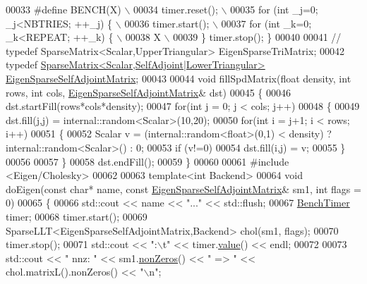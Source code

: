 \begin{DoxyCode}
00033 \textcolor{preprocessor}{#define BENCH(X) \(\backslash\)}
00034 \textcolor{preprocessor}{  timer.reset(); \(\backslash\)}
00035 \textcolor{preprocessor}{  for (int \_j=0; \_j<NBTRIES; ++\_j) \{ \(\backslash\)}
00036 \textcolor{preprocessor}{    timer.start(); \(\backslash\)}
00037 \textcolor{preprocessor}{    for (int \_k=0; \_k<REPEAT; ++\_k) \{ \(\backslash\)}
00038 \textcolor{preprocessor}{        X  \(\backslash\)}
00039 \textcolor{preprocessor}{  \} timer.stop(); \}}
00040 
00041 \textcolor{comment}{// typedef SparseMatrix<Scalar,UpperTriangular> EigenSparseTriMatrix;}
00042 \textcolor{keyword}{typedef} \hyperlink{group___sparse_core___module_class_eigen_1_1_sparse_matrix}{SparseMatrix<Scalar,SelfAdjoint|LowerTriangular>} 
      \hyperlink{group___sparse_core___module_class_eigen_1_1_sparse_matrix}{EigenSparseSelfAdjointMatrix};
00043 
00044 \textcolor{keywordtype}{void} fillSpdMatrix(\textcolor{keywordtype}{float} density, \textcolor{keywordtype}{int} rows, \textcolor{keywordtype}{int} cols,  
      \hyperlink{group___sparse_core___module_class_eigen_1_1_sparse_matrix}{EigenSparseSelfAdjointMatrix}& dst)
00045 \{
00046   dst.startFill(rows*cols*density);
00047   \textcolor{keywordflow}{for}(\textcolor{keywordtype}{int} j = 0; j < cols; j++)
00048   \{
00049     dst.fill(j,j) = internal::random<Scalar>(10,20);
00050     \textcolor{keywordflow}{for}(\textcolor{keywordtype}{int} i = j+1; i < rows; i++)
00051     \{
00052       Scalar v = (internal::random<float>(0,1) < density) ? internal::random<Scalar>() : 0;
00053       \textcolor{keywordflow}{if} (v!=0)
00054         dst.fill(i,j) = v;
00055     \}
00056 
00057   \}
00058   dst.endFill();
00059 \}
00060 
00061 \textcolor{preprocessor}{#include <Eigen/Cholesky>}
00062 
00063 \textcolor{keyword}{template}<\textcolor{keywordtype}{int} Backend>
00064 \textcolor{keywordtype}{void} doEigen(\textcolor{keyword}{const} \textcolor{keywordtype}{char}* name, \textcolor{keyword}{const} \hyperlink{group___sparse_core___module_class_eigen_1_1_sparse_matrix}{EigenSparseSelfAdjointMatrix}& sm1, \textcolor{keywordtype}{int} 
      flags = 0)
00065 \{
00066   std::cout << name << \textcolor{stringliteral}{"..."} << std::flush;
00067   \hyperlink{class_eigen_1_1_bench_timer}{BenchTimer} timer;
00068   timer.start();
00069   SparseLLT<EigenSparseSelfAdjointMatrix,Backend> chol(sm1, flags);
00070   timer.stop();
00071   std::cout << \textcolor{stringliteral}{":\(\backslash\)t"} << timer.\hyperlink{class_eigen_1_1_bench_timer_a26760f963ed8b64c126159bfea57735e}{value}() << endl;
00072 
00073   std::cout << \textcolor{stringliteral}{"  nnz: "} << sm1.\hyperlink{group___sparse_core___module_a03de8b3da2c142ce8698a76123b3e7d3}{nonZeros}() << \textcolor{stringliteral}{" => "} << chol.matrixL().nonZeros() << \textcolor{stringliteral}{"\(\backslash\)n"};

\end{DoxyCode}
